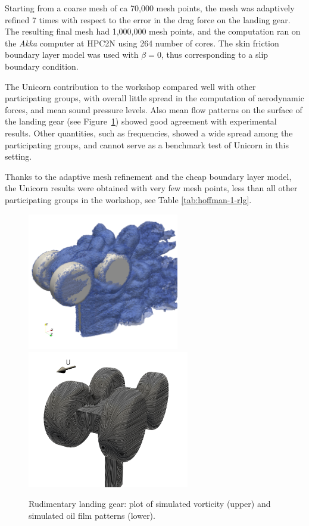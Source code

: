 Starting from a coarse mesh of ca 70,000 mesh points, the mesh was adaptively refined 7 times with respect to the error in the drag force on the landing gear. The resulting final mesh had 1,000,000 mesh points, and the computation ran on the \textit{Akka} computer at HPC2N using 264 number of cores. The skin friction boundary layer model was used with $\beta=0$, thus corresponding to a slip boundary condition.

The Unicorn contribution to the workshop compared well with other participating groups, with overall little spread in the computation of aerodynamic forces, and mean sound pressure levels. Also mean flow patterns on the surface of the landing gear (see Figure~\ref{rlg}) showed good agreement with experimental results. Other quantities, such as frequencies, showed a wide spread among the participating groups, and cannot serve as a benchmark test of Unicorn in this setting.

Thanks to the adaptive mesh refinement and the cheap boundary layer model, the Unicorn results were obtained with very few mesh points, less than all other participating groups in the workshop, see Table \ref{tab:hoffman-1-rlg}.

\begin{figure}
\centering
\includegraphics[height=6cm]{chapters/hoffman-1/png/rlg_vorticity}
\includegraphics[height=6cm]{chapters/hoffman-1/png/oilfilm_back_sim}
\caption{Rudimentary landing gear: plot of simulated vorticity (upper) and simulated oil film patterns (lower).}
\label{rlg}
\end{figure}

